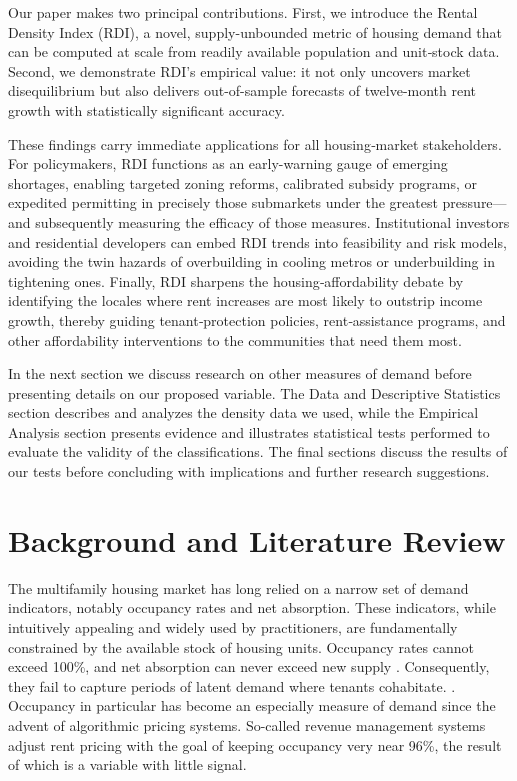 \documentclass[APA,Times1COL]{WileyNJDv5} %
\begin{document}
Our paper makes two principal contributions. First, we introduce the Rental Density Index (RDI), a novel, supply-unbounded metric of housing demand that can be computed at scale from readily available population and unit‐stock data. Second, we demonstrate RDI’s empirical value: it not only uncovers market disequilibrium but also delivers out-of-sample forecasts of twelve-month rent growth with statistically significant accuracy.

These findings carry immediate applications for all housing‐market stakeholders. For policymakers, RDI functions as an early-warning gauge of emerging shortages, enabling targeted zoning reforms, calibrated subsidy programs, or expedited permitting in precisely those submarkets under the greatest pressure—and subsequently measuring the efficacy of those measures. Institutional investors and residential developers can embed RDI trends into feasibility and risk models, avoiding the twin hazards of overbuilding in cooling metros or underbuilding in tightening ones. Finally, RDI sharpens the housing‐affordability debate by identifying the locales where rent increases are most likely to outstrip income growth, thereby guiding tenant‐protection policies, rent‐assistance programs, and other affordability interventions to the communities that need them most.

In the next section we discuss research on other measures of demand before presenting details on our proposed variable. The Data and Descriptive Statistics section describes and analyzes the density data we used, while the Empirical Analysis section presents evidence and illustrates statistical tests performed to evaluate the validity of the classifications. The final sections discuss the results of our tests before concluding with implications and further research suggestions. 

\section{Background and Literature Review}\label{sec2}

The multifamily housing market has long relied on a narrow set of demand indicators, notably occupancy rates and net absorption. These indicators, while intuitively appealing and widely used by practitioners, are fundamentally constrained by the available stock of housing units. Occupancy rates cannot exceed 100\%, and net absorption can never exceed new supply \cite{mueller1999real, gabriel2001rental}. Consequently, they fail to capture periods of latent demand where tenants cohabitate. \cite{sirmans1991determinants, pyhrr1999real}. Occupancy in particular has become an especially measure of demand since the advent of algorithmic pricing systems. So-called revenue management systems adjust rent pricing with the goal of keeping occupancy very near 96\%, \cite{calder2024coordinated} the result of which is a variable with little signal. 
\end{document}
